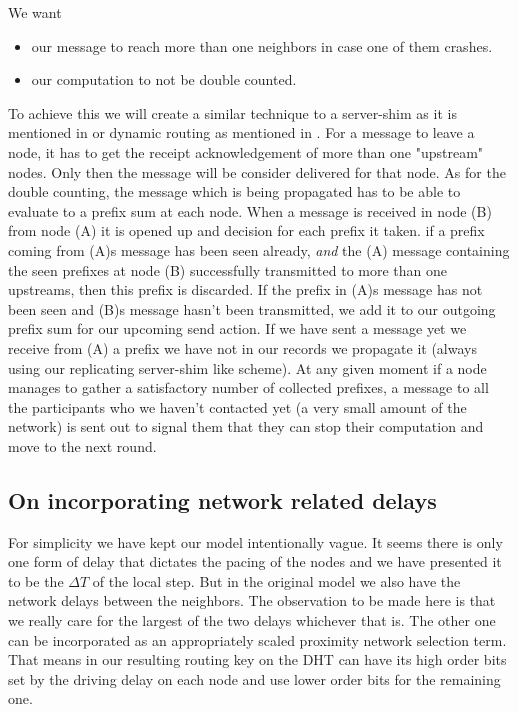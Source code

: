 \documentclass[12pt,notitlepage]{article}
\begin{document}
We want 
\begin{itemize}
\item our message to reach more than one neighbors in case one of them crashes.
\item our computation to not be double counted.
\end{itemize}
To achieve this we will create a similar technique to a server-shim as it is mentioned in \cite{aegean} or dynamic routing as mentioned in
\cite{fat-trees-fault}.
For a message to leave a node, it has to get the receipt acknowledgement of more than one "upstream" nodes. Only then the message will be 
consider delivered for that node.
As for the double counting, the message which is being propagated has to be able to evaluate to a prefix sum at each node. When a message
is received in node (B) from node (A) it is opened up and decision for each prefix it taken. 
if a prefix coming from (A)s message has been seen already, {\it and} the (A) message containing the seen prefixes at node (B) successfully transmitted
to more than one upstreams, then this prefix is discarded. If the prefix in (A)s message has not been seen and (B)s message hasn't been transmitted, we add
it to our outgoing prefix sum for our upcoming send action. If we have sent a message yet we receive from (A) a prefix we have not in our records
we propagate it (always using our replicating server-shim like scheme). 
At any given moment if a node manages to gather a satisfactory number of collected prefixes, a message to all the participants who we haven't contacted yet
(a very small amount of the network) is sent out to signal them that they can stop their computation and move to the next round.

\subsection{On incorporating network related delays}
For simplicity we have kept our model intentionally vague. It seems there is
only one form of delay that dictates the pacing of the nodes and we have
presented it to be the $\Delta T$ of the local step. But in the 
original model we also have the network delays between the neighbors. The 
observation to be made here is that we really care for the largest of the two
delays whichever that is. The other one can be incorporated as an appropriately
scaled proximity network selection term. That means in our resulting routing
key on the DHT can have its high order bits set by the driving delay on each
node and use lower order bits for the remaining one. 
\end{document}
